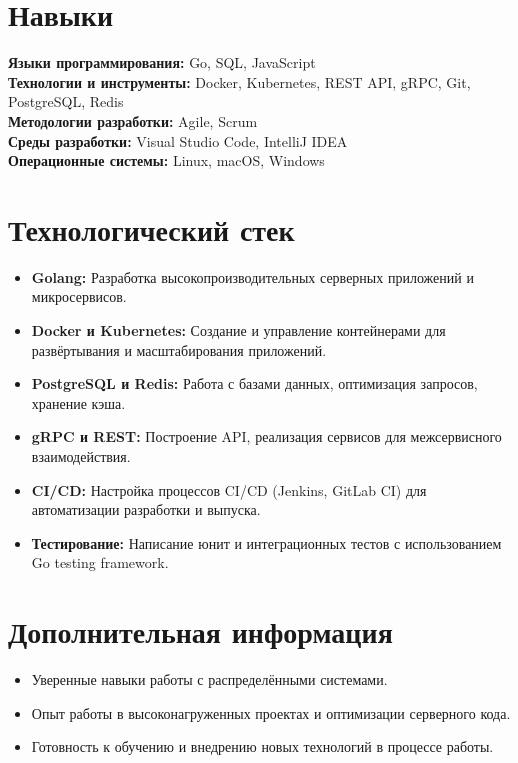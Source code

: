 \documentclass[a4paper,12pt]{article}
\begin{document}
\section{Навыки}
\textbf{Языки программирования:} Go, SQL, JavaScript \\
\textbf{Технологии и инструменты:} Docker, Kubernetes, REST API, gRPC, Git, PostgreSQL, Redis \\
\textbf{Методологии разработки:} Agile, Scrum \\
\textbf{Среды разработки:} Visual Studio Code, IntelliJ IDEA \\
\textbf{Операционные системы:} Linux, macOS, Windows

\section{Технологический стек}
\begin{itemize}[noitemsep]
    \item \textbf{Golang:} Разработка высокопроизводительных серверных приложений и микросервисов.
    \item \textbf{Docker и Kubernetes:} Создание и управление контейнерами для развёртывания и масштабирования приложений.
    \item \textbf{PostgreSQL и Redis:} Работа с базами данных, оптимизация запросов, хранение кэша.
    \item \textbf{gRPC и REST:} Построение API, реализация сервисов для межсервисного взаимодействия.
    \item \textbf{CI/CD:} Настройка процессов CI/CD (Jenkins, GitLab CI) для автоматизации разработки и выпуска.
    \item \textbf{Тестирование:} Написание юнит и интеграционных тестов с использованием Go testing framework.
\end{itemize}

\section{Дополнительная информация}
\begin{itemize}[noitemsep]
    \item Уверенные навыки работы с распределёнными системами.
    \item Опыт работы в высоконагруженных проектах и оптимизации серверного кода.
    \item Готовность к обучению и внедрению новых технологий в процессе работы.
\end{itemize}
\end{document}
